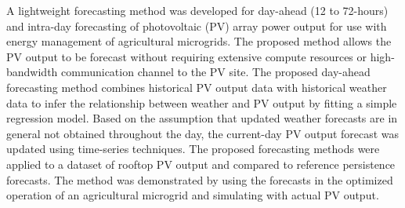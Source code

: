 A lightweight forecasting method was developed for day-ahead (12 to 72-hours) and intra-day forecasting of photovoltaic (PV) array power output for use with energy management of agricultural microgrids.
The proposed method allows the PV output to be forecast without requiring extensive compute resources or high-bandwidth communication channel to the PV site.
The proposed day-ahead forecasting method combines historical PV output data with historical weather data to infer the relationship between weather and PV output by fitting a simple regression model.
Based on the assumption that updated weather forecasts are in general not obtained throughout the day, the current-day PV output forecast was updated using time-series techniques.
The proposed forecasting methods were applied to a dataset of rooftop PV output
and compared to reference persistence forecasts.
The method was demonstrated by using the forecasts in the optimized operation of an agricultural microgrid
and simulating with actual PV output.